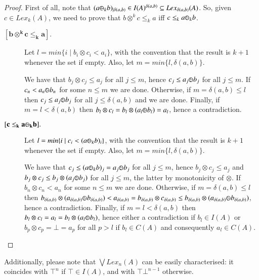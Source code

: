 \documentclass[a4paper]{elsarticle}
\newcommand{\1}{\mathbf{1}}
\def\odiv{{ \ominus\hspace{-8pt}:}\;}
\begin{document}
\begin{proof}
	First of all, note that 
	$(a \odiv_k b)_{\mid \delta(a,b)} \in I(A)^{\delta(a,b)} \subseteq Lex_{\delta(a,b)}(A)$.
	So, given $c \in Lex_k(A)$, we need to prove that
	$b\otimes^k c \leq_k a$ iff $c \leq_k a \odiv_k b$.
	
	\begin{description}
		\item[$\mathbf{[b\otimes^k c \leq_k a].}$]
		Let $l = min \{ i \mid b_i \otimes c_i < a_i\}$,
		with the convention that the result is $k+1$ whenever the set if empty.
		Also, let $m = min \{l, \delta(a,b)\}$.
		
		We have that $b_j \otimes c_j \leq a_j$ for all $j \leq m$, hence
		$c_j \leq a_j \odiv b_j $ for all $j \leq m$. 
		If $c_n < a_n \odiv b_n$ for some $n \leq m$
		we are done. 
		Otherwise, if $m = \delta(a,b) \leq l$ then 
		$c_j \leq a_j \odiv b_j $ for all $j \leq \delta(a,b)$ and we are done.
		Finally, if $m = l < \delta(a,b)$ then 
		$b_l \otimes c_l = b_l \otimes (a_l \odiv b_l) = a_l$,
		hence a contradiction.
		
		\item[$\mathbf{[c \leq_k a \odiv_k b].}$]
		Let $l = min \{ i \mid c_i < (a \odiv_k b)_i\}$,
		with the convention that the result is $k+1$ whenever the set if empty.
		Also, let $m = min \{l, \delta(a,b)\}$.
		
		We have that $c_j \leq (a \odiv_k b)_j = a_j \odiv b_j$ for all $j \leq m$, hence
		$b_j \otimes c_j \leq a_j$ and $b_j \otimes c_j \leq b_j \otimes (a_j \odiv b_j)$ 
		for all $j \leq m$, the latter by monotonicity of $\otimes$.
		If $b_n \otimes c_n < a_n$ for some $n \leq m$
		we are done. 
		Otherwise, if $m = \delta(a,b) \leq l$ then 
		$b_{\delta(a,b)} \otimes (a_{\delta(a,b)} \odiv b_{\delta(a,b)}) <
		a_{\delta(a,b)} = b_{\delta(a,b)} \otimes c_{\delta(a,b)} \leq
		b_{\delta(a,b)} \otimes (a_{\delta(a,b)} \odiv b_{\delta(a,b)})$,
		hence a contradiction.
		Finally, if $m = l < \delta(a,b)$ then 
		$b_l \otimes c_l = a_l = b_l \otimes (a_l \odiv b_l)$, 
		hence either a contradiction
		if $b_l \in I(A)$ or $b_p \otimes c_p = \bot = a_p$ for all $p > l$
		if $b_l \in C(A)$ and consequently $a_l \in C(A)$.
	\end{description}
\end{proof}

Additionally, please note that $\bigvee Lex_n(A)$ can be easily characterised: 
it coincides with $\top^n$
if $\top \in I(A)$, and with $\top \bot^{n -1}$ otherwise.
\end{document}
